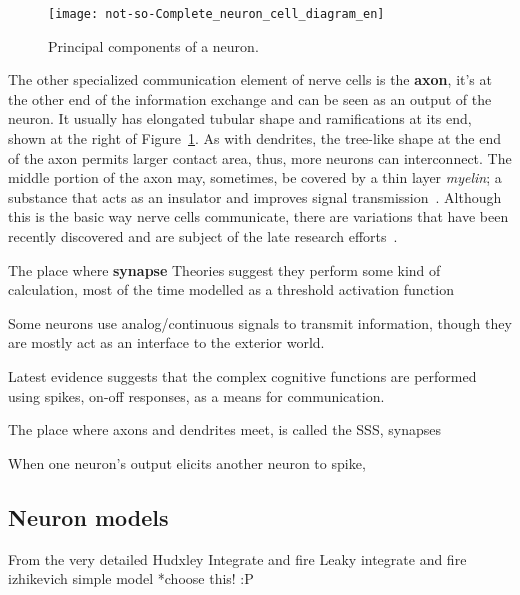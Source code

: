 \begin{figure}
  \begin{center}
    \texttt{[image: not-so-Complete\_neuron\_cell\_diagram\_en]}
    \caption{Principal components of a neuron.}
    \label{fig:neuro:neuron-anatomy}
  \end{center}
\end{figure}

The other specialized communication element of nerve cells is the \textbf{axon}, it's at the other end of the information exchange and can be seen as an output of the neuron. It usually has elongated tubular shape and ramifications at its end, shown at the right of Figure~\ref{fig:neuro:neuron-anatomy}. As with dendrites, the tree-like shape at the end of the axon permits larger contact area, thus, more neurons can interconnect. The middle portion of the axon may, sometimes, be covered by a thin layer \emph{myelin}; a substance that acts as an insulator and improves signal transmission~\cite{thompson2000brain}. Although this is the basic way nerve cells communicate, there are variations that have been recently discovered and are subject of the late research efforts~\cite{Bullock04112005}.

The place where \textbf{synapse}
Theories suggest they perform some kind of calculation, most of the time modelled as a threshold activation function

Some neurons use analog/continuous signals to transmit information, though they are mostly act as an interface to the exterior world.

Latest evidence suggests that the complex cognitive functions are performed using spikes, on-off responses, as a means for communication.

The place where axons and dendrites meet, is called the SSS, synapses

When one neuron's output elicits another neuron to spike, 

\subsection{Neuron models}

From the very detailed Hudxley
Integrate and fire
Leaky integrate and fire
izhikevich simple model *choose this! :P